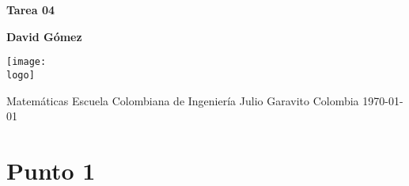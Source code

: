 \documentclass{article}
\newcommand{\logo}{C:/Users/usuario/Documents/U/logo-eci.jpg}
\begin{document}

\begin{titlepage}
	\begin{center}
		\vspace*{1cm}

		\textbf{\Huge{Tarea 04}}

		\vspace{1.5cm}

		\textbf{\large{David Gómez}}

		\vspace{4cm}

		\texttt{[image: \\logo]}

		\vspace{5cm}

		Matemáticas\linebreak
		Escuela Colombiana de Ingeniería Julio Garavito\linebreak
		Colombia\linebreak
		\today

	\end{center}
\end{titlepage}
\clearpage
\tableofcontents
\clearpage

\section{Punto 1}
\end{document}
